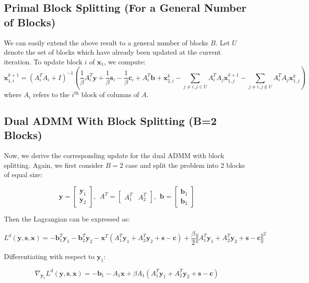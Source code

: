 \documentclass{article}
\begin{document}
\subsection*{Primal Block Splitting (For a General Number of Blocks)}

We can easily extend the above result to a general number of blocks $B$. Let $U$ denote the set of blocks which have already been updated at the current iteration. To update block $i$ of $\mathbf{x}_{1}$, we compute:
\[
\mathbf{x}_{1,i}^{k+1}=\left(A_{i}^{T}A_{i}+I\right)^{-1}\left(\frac{1}{\beta}A_{i}^{T}\mathbf{y}+\frac{1}{\beta}\mathbf{s}_{i}-\frac{1}{\beta}\mathbf{c}_{i}+A_{i}^{T}\mathbf{b}+\mathbf{x}_{2,i}^{k}-\sum_{j\neq i,j\in U}A_{i}^{T}A_{j}\mathbf{x}_{1,j}^{k+1}-\sum_{j\neq i,j\notin U}A_{i}^{T}A_{j}\mathbf{x}_{1,j}^{k}\right)
\]
where $A_{i}$ refers to the $i^{\text{th}}$ block of columns of $A$.

\vspace{0.1in}
\subsection*{Dual ADMM With Block Splitting (B=2 Blocks)}
Now, we derive the corresponding update for the dual ADMM with block splitting. Again, we first consider $B=2$ case and split the problem into 2 blocks of equal size:

\[
\mathbf{y}=\begin{bmatrix}\mathbf{y}_{1}\\
\mathbf{y}_{2}
\end{bmatrix},
\ \
A^{T}=\begin{bmatrix}A_{1}^{T} & A_{2}^{T}\end{bmatrix},
\ \ 
\mathbf{b}=\begin{bmatrix}\mathbf{b}_{1}\\
\mathbf{b}_{2}
\end{bmatrix}
\]

Then the Lagrangian can be expressed as:

\[
L^{d}(\mathbf{y},\mathbf{s},\mathbf{x})=-\mathbf{b}_{1}^{T}\mathbf{y}_{1}-\mathbf{b}_{2}^{T}\mathbf{y}_{2}-\mathbf{x}^{T}\left(A_{1}^{T}\mathbf{y}_{1}+A_{2}^{T}\mathbf{y}_{2}+\mathbf{s}-\mathbf{c}\right)+\frac{\beta}{2}\left\Vert A_{1}^{T}\mathbf{y}_{1}+A_{2}^{T}\mathbf{y}_{2}+\mathbf{s}-\mathbf{c}\right\Vert ^{2}
\]


Differentiating with respect to $\mathbf{y}_{1}$:

\[
\nabla_{\mathbf{y}_{1}}L^{d}(\mathbf{y},\mathbf{s},\mathbf{x})=-\mathbf{b}_{1}-A_{1}\mathbf{x}+\beta A_{1}\left(A_{1}^{T}\mathbf{y}_{1}+A_{2}^{T}\mathbf{y}_{2}+\mathbf{s}-\mathbf{c}\right)
\]
\end{document}
